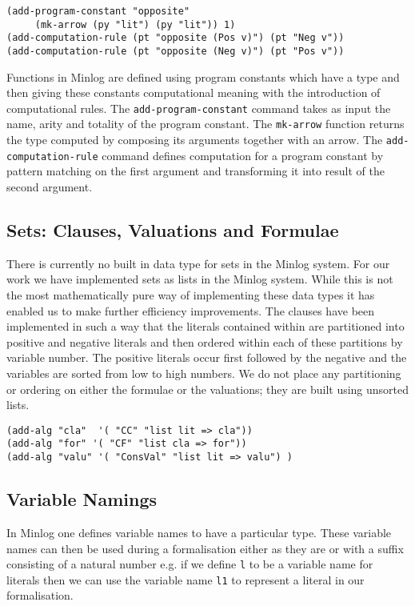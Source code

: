 \begin{lstlisting}[caption = "Definition of the opposite operation in the Minlog System"]
(add-program-constant "opposite" 
     (mk-arrow (py "lit") (py "lit")) 1)
(add-computation-rule (pt "opposite (Pos v)") (pt "Neg v"))
(add-computation-rule (pt "opposite (Neg v)") (pt "Pos v"))
\end{lstlisting}


Functions in Minlog are defined using program constants which have a type and then giving these constants computational meaning with the introduction of computational rules. The \texttt{add-program-constant} command takes as input the name, arity and totality of the program constant. The \texttt{mk-arrow} function returns the type computed by composing its arguments together with an arrow. The \texttt{add-computation-rule} command defines computation for a program constant by pattern matching on the first argument and transforming it into result of the second argument.


\subsection*{Sets: Clauses, Valuations and Formulae}
There is currently no built in data type for sets in the Minlog system. For our work we have implemented sets as lists in the Minlog system. While this is not the most mathematically pure way of implementing these data types it has enabled us to make further efficiency improvements. The clauses have been implemented in such a way that the literals contained within are partitioned into positive and negative literals and then ordered within each of these partitions by variable number. The positive literals occur first followed by the negative and the variables are sorted from low to high numbers. We do not place any partitioning or ordering on either the formulae or the valuations; they are built using unsorted lists.

\begin{lstlisting}[caption = "Definitions of clauses\, formulae and valuations in the Minlog system"]
(add-alg "cla"  '( "CC" "list lit => cla"))
(add-alg "for" '( "CF" "list cla => for"))
(add-alg "valu" '( "ConsVal" "list lit => valu") )
\end{lstlisting}

\subsection*{Variable Namings}
In Minlog one defines variable names to have a particular type.  These variable names can then be used during a formalisation either as they are or with a suffix consisting of a natural number e.g. if we define \texttt{l} to be a variable name for literals then we can use the variable name \texttt{l1} to represent a literal in our formalisation.

